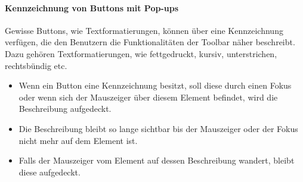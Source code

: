 \paragraph{Kennzeichnung von Buttons mit Pop-ups}

Gewisse Buttons, wie Textformatierungen, können über eine Kennzeichnung verfügen, die den Benutzern die
Funktionalitäten der Toolbar näher beschreibt. Dazu gehören Textformatierungen, wie fettgedruckt, kursiv, 
unterstrichen, rechtsbündig etc. 

\begin{itemize}
	\item Wenn ein Button eine Kennzeichnung besitzt, soll diese durch einen Fokus oder wenn sich der Mauszeiger
		über diesem Element befindet, wird die Beschreibung aufgedeckt.
	\item Die Beschreibung bleibt so lange sichtbar bis der Mauszeiger oder der Fokus nicht mehr auf dem Element 
		ist.
	\item Falls der Mauszeiger vom Element auf dessen Beschreibung wandert, bleibt diese aufgedeckt. 
\end{itemize}

\newpage
